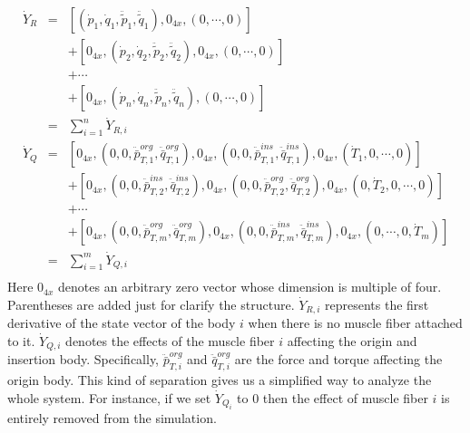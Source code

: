 \documentclass[a4paper,10pt]{article}
\begin{document}
\begin{eqnarray*}\label{dotY2}
\dot{Y}_R & = & [ (\dot{p}_1, \dot{q}_1, \ddot{\tilde{p}}_1, \ddot{\tilde{q}}_1),
                  0_{4x}, (0, \cdots , 0)]\\
          &   & + [ 0_{4x}, (\dot{p}_2, \dot{q}_2, \ddot{\tilde{p}}_2, \ddot{\tilde{q}}_2),
                  0_{4x}, (0, \cdots , 0)]\\
          &   & + \cdots\\
          &   & + [ 0_{4x}, (\dot{p}_n, \dot{q}_n, \ddot{\tilde{p}}_n, \ddot{\tilde{q}}_n),
                  (0, \cdots , 0)]\\
          & = & \sum_{i=1}^{n}{\dot{Y}_{R,i}}\\
\dot{Y}_Q & = & [ 0_{4x}, (0, 0, \ddot{\bar{p}}_{T,1}^{org}, \ddot{\bar{q}}_{T,1}^{org}),
                  0_{4x}, (0, 0, \ddot{\bar{p}}_{T,1}^{ins}, \ddot{\bar{q}}_{T,1}^{ins}),
                  0_{4x}, (\dot{T}_1, 0, \cdots, 0)]\\
          &   & + [ 0_{4x}, (0, 0, \ddot{\bar{p}}_{T,2}^{ins}, \ddot{\bar{q}}_{T,2}^{ins}),
                    0_{4x}, (0, 0, \ddot{\bar{p}}_{T,2}^{org}, \ddot{\bar{q}}_{T,2}^{org}),
                    0_{4x}, (0, \dot{T}_2, 0, \cdots, 0)]\\
          &   & + \cdots\\
          &   & + [ 0_{4x}, (0, 0, \ddot{\bar{p}}_{T,m}^{org}, \ddot{\bar{q}}_{T,m}^{org}),
                    0_{4x}, (0, 0, \ddot{\bar{p}}_{T,m}^{ins}, \ddot{\bar{q}}_{T,m}^{ins}),
                    0_{4x}, (0, \cdots, 0, \dot{T}_m)]\\
          & = & \sum_{i=1}^{m}{\dot{Y}_{Q,i}}\\
\end{eqnarray*}
Here $0_{4x}$ denotes an arbitrary zero vector whose dimension is multiple of four.
Parentheses are added just for clarify the structure.
$\dot{Y}_{R,i}$ represents the first derivative of the state vector of the body $i$
when there is no muscle fiber attached to it. $\dot{Y}_{Q,i}$ denotes the effects of
the muscle fiber $i$ affecting the origin and insertion body. Specifically,
$ \ddot{\bar{p}}_{T,i}^{org} $ and $ \ddot{\bar{q}}_{T,i}^{org} $ are the force and
torque affecting the origin body. This kind of separation gives us a simplified
way to analyze the whole system. For instance, if we set $\dot{Y}_{Q_i}$ to 0 then
the effect of muscle fiber $i$ is entirely removed from the simulation.
\end{document}
